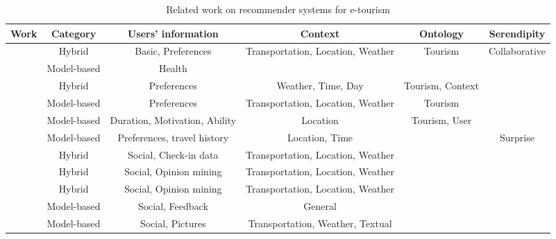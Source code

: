 \begin{table*}[h!]
\footnotesize{
    \centering
    \caption{Related work on recommender systems for e-tourism}
    \label{table:related-work}
    \vspace{-0.3cm}
    \begin{tabular}{|c|c|c|c|c|c|} 
        \hline
        \textbf{Work} & \textbf{Category} & \textbf{Users' information} & \textbf{Context}&\textbf{Ontology}&\textbf{Serendipity} \\
        \hline \hline 

        \cite{rajaonarivo2019rec} & Hybrid & Basic, Preferences & Transportation, Location, Weather & Tourism & Collaborative \\ \hline

        \cite{santos2019using} & Model-based & Health & & & \\ \hline

        \cite{bahramian_abbaspour_claramunt_2017} & Hybrid & Preferences & Weather, Time, Day & Tourism, Context & \\ \hline

        \cite{arigi2018context} & Model-based & Preferences & Transportation, Location, Weather & Tourism & \\ \hline

        \cite{ruotsalo2013smartmuseum} & Model-based & Duration, Motivation, Ability & Location & Tourism, User & \\ \hline

        \cite{shen2016attraction} & Model-based & Preferences, travel history & Location, Time & & Surprise \\ \hline

        \cite{kesorn2017personalized} & Hybrid & Social, Check-in data & Transportation, Location, Weather & & \\ \hline

        \cite{logesh2019exploring} & Hybrid & Social, Opinion mining & Transportation, Location, Weather &  & \\ \hline

        \cite{logesh2018personalised} & Hybrid & Social, Opinion mining & Transportation, Location, Weather &  & \\ \hline

        \cite{hidasi2016general} & Model-based & Social, Feedback  & General &  & \\ \hline

        \cite{sun2019building} & Model-based & Social, Pictures & Transportation, Weather, Textual &  & \\ \hline


\end{tabular}}
\end{table*}
